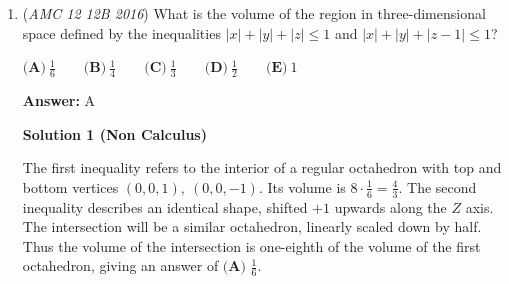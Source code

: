 \begin{enumerate}
\textbf{Solution 2 (Faster Approach)}

Notice that the repeating fraction $0.\overline{abcdef}$ can be represented as $\frac{abcdef}{999999},$ and thereby, $n|999999.$ Also, notice that $0.\overline{wxyz} = \frac{wxyz}{9999},$ so $(n+6)|9999.$ However, we have to make some restrictions here. For instance, if $n|99999,$ then $\frac{1}{n}$ could be expressed as $\frac{a’b’c’d’e’}{99999} = .\overline{a’b’c’d’e’}$ which cannot happen. Therefore, from this, we see that the smallest $m$ such that $n|\underbrace{999\cdots999}_{m \text{ nines}}$ is $m = 6.$ Also, the smallest number $m$ such that $(n+6)|\underbrace{999\cdots999}_{m \text{ nines}}$ is $m = 4$ by similar reasoning. 

 Proceeding, we can factorize $9999 = 99 \times 101,$ after which we see that $n+6$ must contain a prime factor of $101$ as it cannot divide $99$ but must divide $9999.$ However, $101$ is prime, so $101|(n+6)$! Looking at the answer choices, all of the intervals are less than $1000,$ so we know that (the minimum value of) $n+6$ is thereby either $101, 101 \times 3,$ or $101 \times 9.$ Testing, we see that $n+6 = 303$ gives $n = 297 = 3^3 \times 11,$ which in fact is a divisor of $999 \times 1001$ while not being a divisor of $999.$ Therefore, the answer is $\boxed{\text{(B)}}.$ 

 Note: We choose $101 \times 3$ because we know that $101k+6 = 0(mod 11)$. Solving, we acquire $2k=6(mod 11)$ and $k=3$. Now that we know $3 \times 101 = n+6$, we are done.

 -Amon26

 


	\item (\textit{AMC 12 12B 2016}) What is the volume of the region in three-dimensional space defined by the inequalities $|x|+|y|+|z|\le1$ and $|x|+|y|+|z-1|\le1$?


 $\textbf{(A)}\ \frac{1}{6}\qquad\textbf{(B)}\ \frac{1}{4}\qquad\textbf{(C)}\ \frac{1}{3}\qquad\textbf{(D)}\ \frac{1}{2}\qquad\textbf{(E)}\ 1$

 \textbf{Answer: }A



\textbf{Solution 1 (Non Calculus)}

The first inequality refers to the interior of a regular octahedron with top and bottom vertices $(0,0,1),\ (0,0,-1)$. Its volume is $8\cdot\frac16=\frac43$. The second inequality describes an identical shape, shifted $+1$ upwards along the $Z$ axis. The intersection will be a similar octahedron, linearly scaled down by half. Thus the volume of the intersection is one-eighth of the volume of the first octahedron, giving an answer of $\textbf{(A) }\frac16$.


\end{enumerate}
